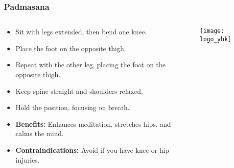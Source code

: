 \begin{frame}[fragile]\frametitle{Padmasana}
\begin{columns}
    \begin{column}[T]{0.5\linewidth}
      \begin{itemize}
        \item Sit with legs extended, then bend one knee.
        \item Place the foot on the opposite thigh.
        \item Repeat with the other leg, placing the foot on the opposite thigh.
        \item Keep spine straight and shoulders relaxed.
        \item Hold the position, focusing on breath.
        \item \textbf{Benefits:} Enhances meditation, stretches hips, and calms the mind.
        \item \textbf{Contraindications:} Avoid if you have knee or hip injuries.
      \end{itemize}
    \end{column}
    \begin{column}[T]{0.5\linewidth}
        \begin{center}
        \texttt{[image: logo\_yhk]}
        \end{center}    
    \end{column}
  \end{columns}
\end{frame}

